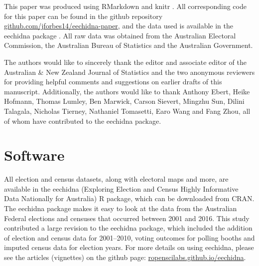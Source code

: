 \documentclass[
  times, doublespace]{anzsauth}
\begin{document}
This paper was produced using \textsf{RMarkdown} \citep{rmarkdown} and \textsf{knitr} \citep{knitr}. All corresponding code for this paper can be found in the github repository \url{github.com/jforbes14/eechidna-paper}, and the data used is available in the \textsf{eechidna} package \citep{eechidna}. All raw data was obtained from the Australian Electoral Commission, the Australian Bureau of Statistics and the Australian Government.

The authors would like to sincerely thank the editor and associate editor of the Australian \& New Zealand Journal of Statistics and the two anonymous reviewers for providing helpful comments and suggestions on earlier drafts of this manuscript. Additionally, the authors would like to thank Anthony Ebert, Heike Hofmann, Thomas Lumley, Ben Marwick, Carson Sievert, Mingzhu Sun, Dilini Talagala, Nicholas Tierney, Nathaniel Tomasetti, Earo Wang and Fang Zhou, all of whom have contributed to the \textsf{eechidna} package.

\hypertarget{software}{%
\section{Software}\label{software}}

All election and census datasets, along with electoral maps and more, are available in the \textsf{eechidna} (Exploring Election and Census Highly Informative Data Nationally for Australia) \textsf{R} package, which can be downloaded from CRAN. The \textsf{eechidna} package makes it easy to look at the data from the Australian Federal elections and censuses that occurred between 2001 and 2016. This study contributed a large revision to the \textsf{eechidna} package, which included the addition of election and census data for 2001--2010, voting outcomes for polling booths and imputed census data for election years. For more details on using \textsf{eechidna}, please see the articles (vignettes) on the github page: \url{ropenscilabs.github.io/eechidna}.

\renewcommand\refname{References}
  
\end{document}

